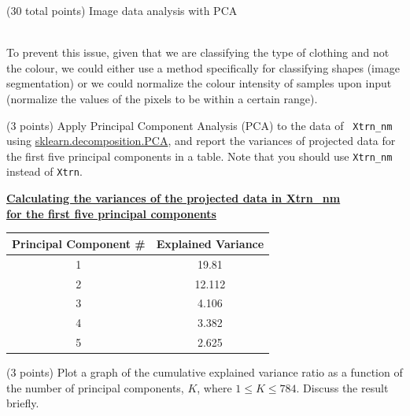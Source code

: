 \documentclass[12pt]{article}
\begin{document}
\begin{question}{(30 total points) Image data analysis with PCA}
\begin{subquestion}
\begin{answerbox}{50.75em}
{\\
    To prevent this issue, given that we are classifying the type of clothing and not the colour, we could either use a method specifically for classifying shapes (image segmentation) or we could normalize the colour intensity of samples upon input (normalize the values of the pixels to be within a certain range).}
  \end{answerbox}



   \end{subquestion}

   \begin{subquestion}{(3 points)
       Apply Principal Component Analysis (PCA) to the data of {\tt
         Xtrn\_nm} using \href{https://scikit-learn.org/0.19/modules/generated/sklearn.decomposition.PCA.html}{sklearn.decomposition.PCA}, and report the variances of projected data for the first five principal components in a table.
        Note that you should use {\tt Xtrn\_nm} instead of {\tt Xtrn}.
     } \label{Q1.pca.variance}



    \begin{answerbox}{12em}
        \begin{center}
        \textbf{\underline{Calculating the variances of the projected data in Xtrn\_nm}}\\
        \textbf{\underline{for the first five principal components}}\\
        \vspace{0.5cm}
        \footnotesize{
        \begin{tabular}{ |c|c| } \hline
        \textbf{Principal Component \#} & \textbf{Explained Variance} \\ \hline
        1 & 19.81 \\
        2 & 12.112 \\
        3 & 4.106 \\
        4 & 3.382 \\
        5 & 2.625 \\\hline
        \end{tabular}
        }
        \end{center}
    \end{answerbox}
    


   \end{subquestion}

   \begin{subquestion}{(3 points)
       Plot a graph of the cumulative explained variance ratio as a function of the number of principal components, $K$, where $1\le K \le 784$.
       Discuss the result briefly.
     } \label{Q1.plot.pca.variance}
   


\end{subquestion}
\end{question}
\end{document}
